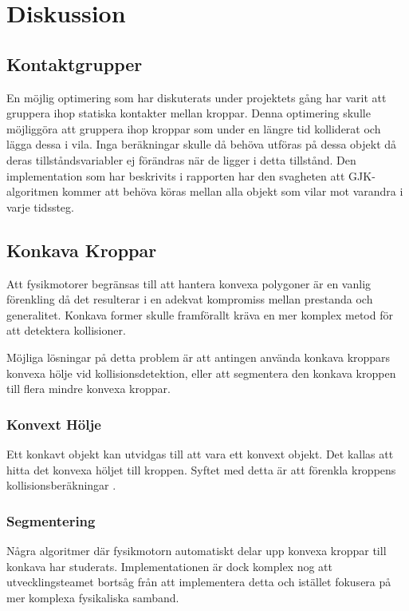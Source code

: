\documentclass[a4paper,12pt,twopage,swedish]{article}
\begin{document}


\section{Diskussion}


\subsection{Kontaktgrupper}
En möjlig optimering som har diskuterats under projektets gång har varit att gruppera ihop statiska kontakter mellan kroppar. Denna optimering skulle möjliggöra att gruppera ihop kroppar som under en längre tid kolliderat och lägga dessa i vila. Inga beräkningar skulle då behöva utföras på dessa objekt då deras tillståndsvariabler ej förändras när de ligger i detta tillstånd. Den implementation som har beskrivits i rapporten har den svagheten att GJK-algoritmen kommer att behöva köras mellan alla objekt som vilar mot varandra i varje tidssteg.

\subsection{Konkava Kroppar}
Att fysikmotorer begränsas till att hantera konvexa polygoner är en vanlig förenkling då det resulterar i en adekvat kompromiss mellan prestanda och generalitet. Konkava former skulle framförallt kräva en mer komplex metod för att detektera kollisioner.

Möjliga lösningar på detta problem är att antingen använda konkava kroppars konvexa hölje vid kollisionsdetektion, eller att segmentera den konkava kroppen till flera mindre konvexa kroppar.

\subsubsection{Konvext Hölje}
Ett konkavt objekt kan utvidgas till att vara ett konvext objekt. Det kallas att hitta det konvexa höljet till kroppen. Syftet med detta är att förenkla kroppens kollisionsberäkningar \cite[s.~29]{avis97}.

\subsubsection{Segmentering}
Några algoritmer där fysikmotorn automatiskt delar upp konvexa kroppar till konkava har studerats.
Implementationen är dock komplex nog att utvecklingsteamet bortsåg från att implementera detta och istället fokusera på mer komplexa fysikaliska samband.
\end{document}
